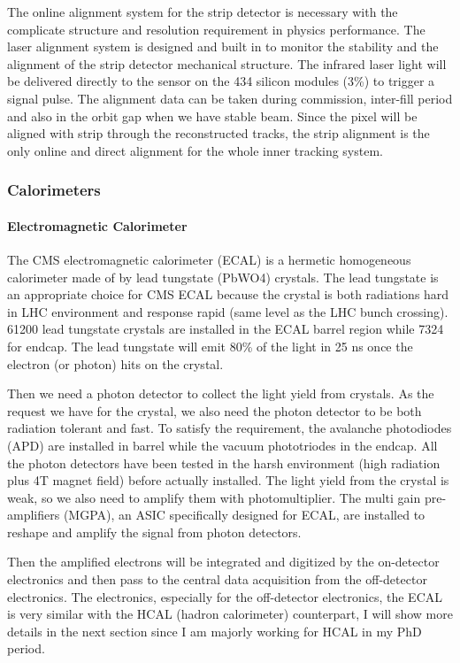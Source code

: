 The online alignment system for the strip detector is necessary with the complicate structure and resolution requirement in physics performance. The laser alignment system is designed and built in to monitor the stability and the alignment of the strip detector mechanical structure. The infrared laser light will be delivered directly to the sensor on the 434 silicon modules (3\%) to trigger a signal pulse. The alignment data can be taken during commission, inter-fill period and also in the orbit gap when we have stable beam. Since the pixel will be aligned with strip through the reconstructed tracks, the strip alignment is the only online and direct alignment for the whole inner tracking system. 


\subsubsection{Calorimeters}
\paragraph{Electromagnetic Calorimeter}
The CMS electromagnetic calorimeter (ECAL) is a hermetic homogeneous calorimeter made of by lead tungstate (PbWO4) crystals. The lead tungstate is an appropriate choice for CMS ECAL because the crystal is both radiations hard in LHC environment and response rapid (same level as the LHC bunch crossing). 61200 lead tungstate crystals are installed in the ECAL barrel region while 7324 for endcap. The lead tungstate will emit 80\% of the light in 25 ns once the electron (or photon) hits on the crystal.

Then we need a photon detector to collect the light yield from crystals. As the request we have for the crystal, we also need the photon detector to be both radiation tolerant and fast. To satisfy the requirement, the avalanche photodiodes (APD) are installed in barrel while the vacuum phototriodes in the endcap. All the photon detectors have been tested in the harsh environment (high radiation plus 4T magnet field) before actually installed. The light yield from the crystal is weak, so we also need to amplify them with photomultiplier. The multi gain pre-amplifiers (MGPA), an ASIC specifically designed for ECAL, are installed to reshape and amplify the signal from photon detectors.

Then the amplified electrons will be integrated and digitized by the on-detector electronics and then pass to the central data acquisition from the off-detector electronics. The electronics, especially for the off-detector electronics, the ECAL is very similar with the HCAL (hadron calorimeter) counterpart, I will show more details in the next section since I am majorly working for HCAL in my PhD period. 

